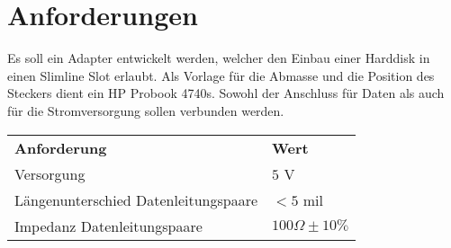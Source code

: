 
\section{Anforderungen}
Es soll ein Adapter entwickelt werden, welcher den Einbau einer Harddisk in 
einen Slimline Slot erlaubt. Als Vorlage für die Abmasse und die Position 
des Steckers dient ein HP Probook 4740s. Sowohl der Anschluss für Daten als 
auch für die Stromversorgung sollen verbunden werden. 

\begin{table}[h!]
  \begin{tabular}{@{}ll}
    \textbf{Anforderung}        & \textbf{Wert} \\
    Versorgung                  & $5$ V \\
    Längenunterschied Datenleitungspaare & $< 5$ mil \\
    Impedanz Datenleitungspaare & $100 \Omega \pm 10 \%$ \\
  \end{tabular}
\end{table}

